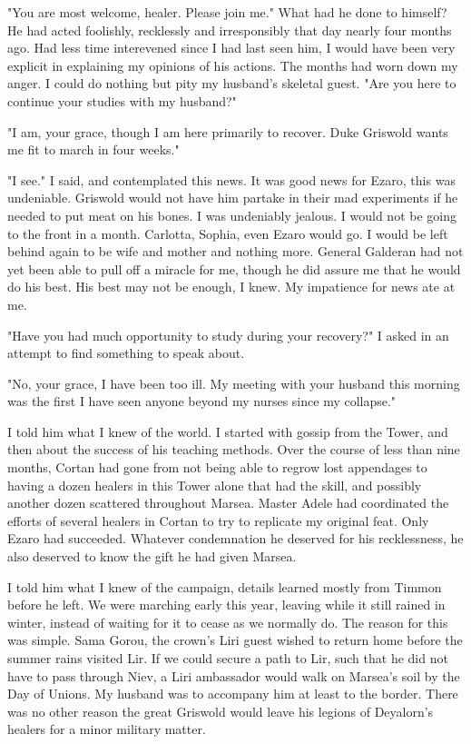 \documentclass{article}
\begin{document}
"You are most welcome, healer. Please join me." What had he done to himself? He had acted foolishly, recklessly and irresponsibly that day nearly four months ago. Had less time interevened since I had last seen him, I would have been very explicit in explaining my opinions of his actions. The months had worn down my anger. I could do nothing but pity my husband's skeletal guest. "Are you here to continue your studies with my husband?"

"I am, your grace, though I am here primarily to recover. Duke Griswold wants me fit to march in four weeks."

"I see." I said, and contemplated this news. It was good news for Ezaro, this was undeniable. Griswold would not have him partake in their mad experiments if he needed to put meat on his bones. I was undeniably jealous. I would not be going to the front in a month. Carlotta, Sophia, even Ezaro would go. I would be left behind again to be wife and mother and nothing more. General Galderan had not yet been able to pull off a miracle for me, though he did assure me that he would do his best. His best may not be enough, I knew. My impatience for news ate at me. 

"Have you had much opportunity to study during your recovery?" I asked in an attempt to find something to speak about.

"No, your grace, I have been too ill. My meeting with your husband this morning was the first I have seen anyone beyond my nurses since my collapse."

I told him what I knew of the world. I started with gossip from the Tower, and then about the success of his teaching methods. Over the course of less than nine months, Cortan had gone from not being able to regrow lost appendages to having a dozen healers in this Tower alone that had the skill, and possibly another dozen scattered throughout Marsea. Master Adele had coordinated the efforts of several healers in Cortan to try to replicate my original feat. Only Ezaro had succeeded. Whatever condemnation he deserved for his recklessness, he also deserved to know the gift he had given Marsea.

I told him what I knew of the campaign, details learned mostly from Timmon before he left. We were marching early this year, leaving while it still rained in winter, instead of waiting for it to cease as we normally do. The reason for this was simple. Sama Gorou, the crown's Liri guest wished to return home before the summer rains visited Lir. If we could secure a path to Lir, such that he did not have to pass through Niev, a Liri ambassador would walk on Marsea's soil by the Day of Unions. My husband was to accompany him at least to the border. There was no other reason the great Griswold would leave his legions of Deyalorn's healers for a minor military matter.
\end{document}
